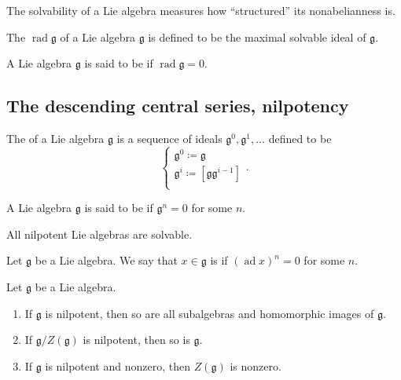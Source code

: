 \documentclass{article}
\newcommand{\lb}[1]{\ensuremath{\left[{#1}\right]}}
\DeclareMathOperator{\rad}{rad}
\DeclareMathOperator{\ad}{ad}
\newcommand*\frkg{{\ensuremath{\mathfrak{g}}}}
\begin{document}
The solvability of a Lie algebra measures how ``structured'' its nonabelianness is.

\begin{definition}
    The  $\rad \frkg$ of a Lie algebra $\frkg$ is defined to be the maximal solvable ideal of $\frkg$.
\end{definition}

\begin{definition}
    A Lie algebra $\frkg$ is said to be  if $\rad \frkg = 0$.
\end{definition}

\subsection{The descending central series, nilpotency}

\begin{definition}
    The  of a Lie algebra $\frkg$ is a sequence of ideals $\frkg^0, \frkg^1, \ldots$ defined to be
    \[
        \begin{cases}
            \frkg^0 \coloneq \frkg \\
            \frkg^i \coloneq \lb{\frkg\frkg^{i-1}} \\
        \end{cases}.
    \]
\end{definition}

\begin{definition}
    A Lie algebra $\frkg$ is said to be  if $\frkg^n = 0$ for some $n$.
\end{definition}

\begin{proposition}
    All nilpotent Lie algebras are solvable.
\end{proposition}

\begin{definition}
    Let $\frkg$ be a Lie algebra.
    We say that $x \in \frkg$ is  if $(\ad x)^n = 0$ for some $n$.
\end{definition}

\begin{theorem}
    Let $\frkg$ be a Lie algebra.
    \begin{enumerate}[label=(\alph*)]
        \item 
            If $\frkg$ is nilpotent, then so are all subalgebras and homomorphic images of $\frkg$.
        \item 
            If $\frkg/Z(\frkg)$ is nilpotent, then so is $\frkg$.
        \item 
            If $\frkg$ is nilpotent and nonzero, then $Z(\frkg)$ is nonzero.
    \end{enumerate}
\end{theorem}
\end{document}
